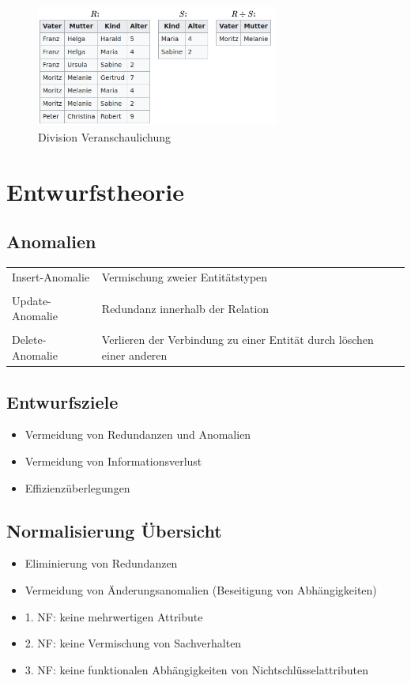 \documentclass[a4paper]{article}
\begin{document}
\begin{figure} [htp]
    \centering
    \includegraphics[width=8cm]{images/Division.png}
    \caption{Division Veranschaulichung}
    \label{fig:Division}
\end{figure}


\section{Entwurfstheorie}

\subsection{Anomalien}
\begin{tabular}{l l}
     Insert-Anomalie&  Vermischung zweier Entitätstypen\\
     & \\
     Update-Anomalie & Redundanz innerhalb der Relation \\
     & \\
     Delete-Anomalie & Verlieren der Verbindung zu einer Entität durch löschen einer anderen
\end{tabular}

\subsection{Entwurfsziele}
\begin{itemize}
    \item Vermeidung von Redundanzen und Anomalien
    \item Vermeidung von Informationsverlust
    \item Effizienzüberlegungen
\end{itemize}

\subsection{Normalisierung Übersicht}
\begin{itemize}
    \item Eliminierung von Redundanzen
    \item Vermeidung von Änderungsanomalien (Beseitigung von Abhängigkeiten) 
    \item 1. NF: keine mehrwertigen Attribute
    \item 2. NF: keine Vermischung von Sachverhalten
    \item 3. NF: keine funktionalen Abhängigkeiten von Nichtschlüsselattributen
\end{itemize}
\end{document}
